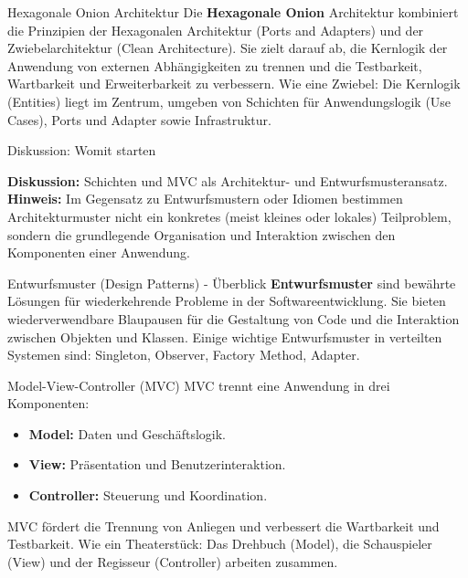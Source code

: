 \documentclass{beamer}
\begin{document}
\begin{frame}{Hexagonale Onion Architektur}
    Die \textbf{Hexagonale Onion} Architektur kombiniert die Prinzipien der Hexagonalen Architektur (Ports and Adapters) und der Zwiebelarchitektur (Clean Architecture). Sie zielt darauf ab, die Kernlogik der Anwendung von externen Abhängigkeiten zu trennen und die Testbarkeit, Wartbarkeit und Erweiterbarkeit zu verbessern.  Wie eine Zwiebel:  Die Kernlogik (Entities) liegt im Zentrum, umgeben von Schichten für Anwendungslogik (Use Cases), Ports und Adapter sowie Infrastruktur.
\end{frame}

\begin{frame}{Diskussion: Womit starten}
   
    \textbf{Diskussion:} Schichten und MVC als Architektur- und Entwurfsmusteransatz.\\ 
    \textbf{Hinweis:} Im Gegensatz zu Entwurfsmustern oder Idiomen bestimmen Architekturmuster nicht ein konkretes (meist kleines oder lokales) Teilproblem, sondern die grundlegende Organisation und Interaktion zwischen den Komponenten einer Anwendung. 
\end{frame}


\begin{frame}{Entwurfsmuster (Design Patterns) - Überblick}
\textbf{Entwurfsmuster} sind bewährte Lösungen für wiederkehrende Probleme in der Softwareentwicklung. Sie bieten wiederverwendbare Blaupausen für die Gestaltung von Code und die Interaktion zwischen Objekten und Klassen. Einige wichtige Entwurfsmuster in verteilten Systemen sind:  Singleton, Observer, Factory Method, Adapter.
\end{frame}


\begin{frame}{Model-View-Controller (MVC)}
    MVC trennt eine Anwendung in drei Komponenten:
    \begin{itemize}
        \item \textbf{Model:}  Daten und Geschäftslogik.
        \item \textbf{View:}  Präsentation und Benutzerinteraktion.
        \item \textbf{Controller:}  Steuerung und Koordination.
    \end{itemize}
    MVC fördert die Trennung von Anliegen und verbessert die Wartbarkeit und Testbarkeit.  Wie ein Theaterstück: Das Drehbuch (Model), die Schauspieler (View) und der Regisseur (Controller) arbeiten zusammen.
\end{frame}
\end{document}
